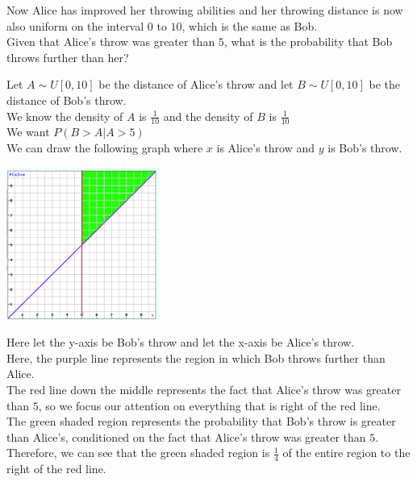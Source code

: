 \question Now Alice has improved her throwing abilities and her throwing distance is now also uniform on the interval $0$ to $10$, which is the same as Bob. \\
Given that Alice's throw was greater than $5$, what is the probability that Bob throws further than her? 
\begin{solution}
	Let $A \mathtt{\sim} U[0, 10]$ be the distance of Alice's throw and let $B \mathtt{\sim} U[0, 10]$ be the distance of Bob's throw.  \\
	We know the density of $A$ is $\frac{1}{10}$ and the density of $B$ is $\frac{1}{10}$ \\
	We want $P(B > A | A > 5)$ \\
	We can draw the following graph where $x$ is Alice's throw and $y$ is Bob's throw. \\
	\begin{center}
		\includegraphics[width=5cm]{joint_uniform2.png}
	\end{center}
	Here let the y-axis be Bob's throw and let the x-axis be Alice's throw. \\
	Here, the purple line represents the region in which Bob throws further than Alice. \\
	The red line down the middle represents the fact that Alice's throw was greater than $5$, so we focus our attention on everything that is right of the red line. \\
	The green shaded region represents the probability that Bob's throw is greater than Alice's, conditioned on the fact that Alice's throw was greater than $5$. \\
	Therefore, we can see that the green shaded region is $\frac{1}{4}$ of the entire region to the right of the red line. \\
	

\end{solution}
